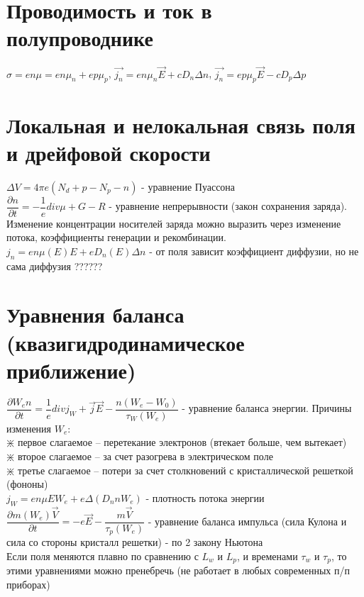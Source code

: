 \begin{multicols*}{2}
		\section{Проводимость и ток в полупроводнике}
		$\sigma = en\mu = en\mu_n + ep\mu_p$, \quad $\vec{j_n} = en\mu_n\vec{E} + cD_n\Delta n$, \quad $\vec{j_n} = ep\mu_p\vec{E} - cD_p\Delta p$
		
		\section{Локальная и нелокальная связь поля и дрейфовой скорости}
		$\Delta V = 4 \pi e (N_d + p - N_p - n)$ - уравнение Пуассона\\
		$\dfrac{\partial n}{\partial t} = - \dfrac{1}{e} div \mu + G - R$ - уравнение непрерывности (закон сохранения заряда). Изменение концентрации носителей заряда можно выразить через изменение потока, коэффициенты генерации и рекомбинации.\\
		$j_n = en \mu(E) E + e D_n(E) \Delta n$ - от поля зависит коэффициент диффузии, но не сама диффузия ??????

		\section{Уравнения баланса (квазигидродинамическое приближение)}
		$\dfrac{\partial W_e n}{\partial t} = \dfrac{1}{e} div j_W + \vec{j}\vec{E} - \dfrac{n(W_e - W_0)}{\tau_W(W_e)}$ - уравнение баланса энергии. Причины изменения $W_e$:\\
		$\divideontimes$ первое слагаемое – перетекание электронов (втекает больше, чем вытекает)\\
		$\divideontimes$ второе слагаемое – за счет разогрева в электрическом поле\\
		$\divideontimes$ третье слагаемое – потери за счет столкновений с кристаллической решеткой (фононы)\\
		$j_W = en \mu E W_e + e \Delta(D_n n W_e)$ - плотность потока энергии\\
		$\dfrac{\partial m (W_e) \vec{V}}{\partial t} = -e\vec{E} - \dfrac{m\vec{V}}{\tau_p(W_e)}$ - уравнение баланса импульса (сила Кулона и сила со стороны кристалл решетки) - по 2 закону Ньютона \\
		Если поля меняются плавно по сравнению с $L_w$ и $L_p$, и временами $\tau_w$ и $\tau_p$, то этими уравнениями можно пренебречь (не работает в любых современных п/п приборах)


\end{multicols*}
